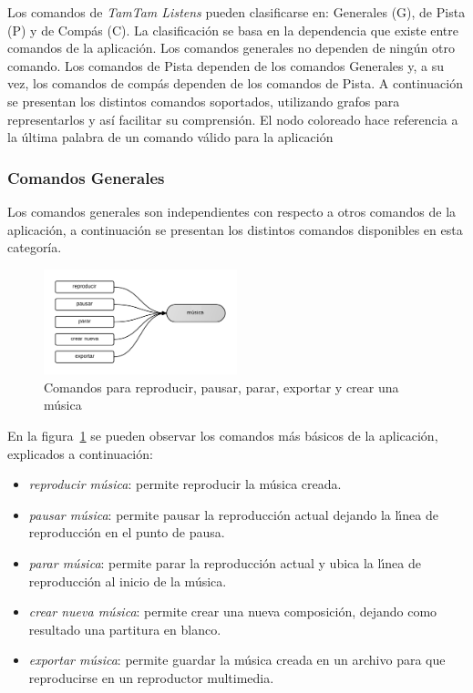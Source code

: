 Los comandos de \emph{TamTam Listens} pueden clasificarse en: Generales (G), de Pista (P) y de Comp\'as (C). La clasificaci\'on
se basa en la dependencia que existe entre comandos de la aplicaci\'on. Los comandos generales no dependen de ning\'un otro comando.
Los comandos de Pista dependen de los comandos Generales y, a su vez, los comandos de comp\'as dependen de los comandos de Pista.
A continuaci\'on se presentan los distintos comandos soportados, utilizando grafos para representarlos y as\'i facilitar
su comprensi\'on. El nodo coloreado hace referencia a la \'ultima palabra de un comando v\'alido para la aplicaci\'on

\subsubsection{Comandos Generales}

Los comandos generales son independientes con respecto a otros comandos de la aplicaci\'on, a continuaci\'on se presentan los distintos
comandos disponibles en esta categor\'ia. 
\begin{figure}[H] 
\centering
\includegraphics[width=0.5\textwidth]{./graphics/cmd-musica.png}
\caption{Comandos para reproducir, pausar, parar, exportar y crear una m\'usica}
\label{figure:cmd-crear-musica}
\end{figure}

En la figura~\ref{figure:cmd-crear-musica} se pueden observar los comandos m\'as b\'asicos
de la aplicaci\'on, explicados a continuaci\'on:

\begin{itemize}
\item \emph{reproducir m\'usica}: permite reproducir la m\'usica creada.
\item \emph{pausar m\'usica}: permite pausar la reproducci\'on actual dejando la l{\'\i}nea de reproducci\'on en el
punto de pausa.
\item \emph{parar m\'usica}: permite parar la reproducci\'on actual y ubica la l{\'\i}nea de reproducci\'on al inicio de
la m\'usica.
\item \emph{crear nueva m\'usica}:  permite crear una nueva composici\'on, dejando como resultado una
partitura en blanco.
\item \emph{exportar m\'usica}: permite guardar la m\'usica creada en un archivo para que reproducirse en un
reproductor multimedia.
\end{itemize}

